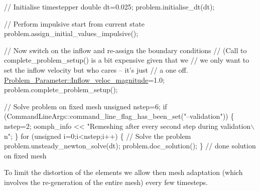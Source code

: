 \begin{DoxyCodeInclude}
 \textcolor{comment}{// Initialise timestepper}
 \textcolor{keywordtype}{double} dt=0.025;
 problem.initialise\_dt(dt);
 
 \textcolor{comment}{// Perform impulsive start from current state}
 problem.assign\_initial\_values\_impulsive();


 \textcolor{comment}{// Now switch on the inflow and re-assign the boundary conditions}
 \textcolor{comment}{// (Call to complete\_problem\_setup() is a bit expensive given that we}
 \textcolor{comment}{// we only want to set the inflow velocity but who cares -- it's just}
 \textcolor{comment}{// a one off.}
 \hyperlink{namespaceProblem__Parameter_a7792613e563a733ad88b8e15d126fc3a}{Problem\_Parameter::Inflow\_veloc\_magnitude}=1.0;
 problem.complete\_problem\_setup();


 \textcolor{comment}{// Solve problem on fixed mesh}
 \textcolor{keywordtype}{unsigned} nstep=6;
 \textcolor{keywordflow}{if} (CommandLineArgs::command\_line\_flag\_has\_been\_set(\textcolor{stringliteral}{"--validation"}))
  \{
   nstep=2;
   oomph\_info << \textcolor{stringliteral}{"Remeshing after every second step during validation\(\backslash\)n"};
  \}
 \textcolor{keywordflow}{for} (\textcolor{keywordtype}{unsigned} i=0;i<nstep;i++)
  \{
   \textcolor{comment}{// Solve the problem}
   problem.unsteady\_newton\_solve(dt);    
   problem.doc\_solution();
  \} \textcolor{comment}{// done solution on fixed mesh}

\end{DoxyCodeInclude}


To limit the distortion of the elements we allow then mesh adaptation (which involves the re-\/generation of the entire mesh) every few timesteps.



